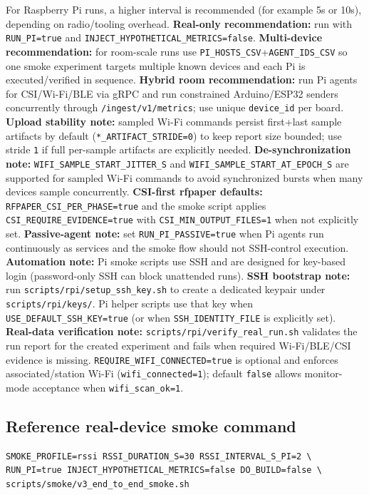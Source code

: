 \documentclass[11pt,a4paper]{article}
\begin{document}
For Raspberry Pi runs, a higher interval is recommended (for example 5s or 10s), depending on radio/tooling overhead.
\textbf{Real-only recommendation:} run with \texttt{RUN\_PI=true} and \texttt{INJECT\_HYPOTHETICAL\_METRICS=false}.
\textbf{Multi-device recommendation:} for room-scale runs use \texttt{PI\_HOSTS\_CSV}+\texttt{AGENT\_IDS\_CSV} so one smoke experiment targets multiple known devices and each Pi is executed/verified in sequence.
\textbf{Hybrid room recommendation:} run Pi agents for CSI/Wi-Fi/BLE via gRPC and run constrained Arduino/ESP32 senders concurrently through \texttt{/ingest/v1/metrics}; use unique \texttt{device\_id} per board.
\textbf{Upload stability note:} sampled Wi-Fi commands persist first+last sample artifacts by default (\texttt{*\_ARTIFACT\_STRIDE=0}) to keep report size bounded; use stride \texttt{1} if full per-sample artifacts are explicitly needed.
\textbf{De-synchronization note:} \texttt{WIFI\_SAMPLE\_START\_JITTER\_S} and \texttt{WIFI\_SAMPLE\_START\_AT\_EPOCH\_S} are supported for sampled Wi-Fi commands to avoid synchronized bursts when many devices sample concurrently.
\textbf{CSI-first rfpaper defaults:} \texttt{RFPAPER\_CSI\_PER\_PHASE=true} and the smoke script applies \texttt{CSI\_REQUIRE\_EVIDENCE=true} with \texttt{CSI\_MIN\_OUTPUT\_FILES=1} when not explicitly set.
\textbf{Passive-agent note:} set \texttt{RUN\_PI\_PASSIVE=true} when Pi agents run continuously as services and the smoke flow should not SSH-control execution.
\textbf{Automation note:} Pi smoke scripts use SSH and are designed for key-based login (password-only SSH can block unattended runs).
\textbf{SSH bootstrap note:} run \texttt{scripts/rpi/setup\_ssh\_key.sh} to create a dedicated keypair under \texttt{scripts/rpi/keys/}. Pi helper scripts use that key when \texttt{USE\_DEFAULT\_SSH\_KEY=true} (or when \texttt{SSH\_IDENTITY\_FILE} is explicitly set).
\textbf{Real-data verification note:} \texttt{scripts/rpi/verify\_real\_run.sh} validates the run report for the created experiment and fails when required Wi-Fi/BLE/CSI evidence is missing.
\texttt{REQUIRE\_WIFI\_CONNECTED=true} is optional and enforces associated/station Wi-Fi (\texttt{wifi\_connected=1}); default \texttt{false} allows monitor-mode acceptance when \texttt{wifi\_scan\_ok=1}.

\subsection{Reference real-device smoke command}
\begin{verbatim}
SMOKE_PROFILE=rssi RSSI_DURATION_S=30 RSSI_INTERVAL_S_PI=2 \
RUN_PI=true INJECT_HYPOTHETICAL_METRICS=false DO_BUILD=false \
scripts/smoke/v3_end_to_end_smoke.sh
\end{verbatim}
\end{document}
